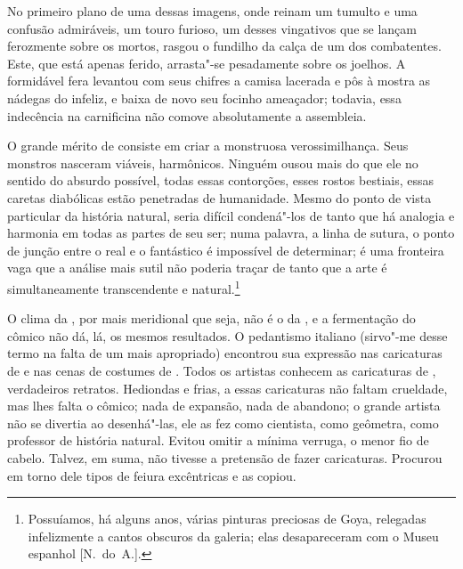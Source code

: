 No primeiro plano de uma dessas imagens, onde reinam um tumulto e uma
confusão admiráveis, um touro furioso, um desses vingativos que se
lançam ferozmente sobre os mortos, rasgou o fundilho da calça de um dos
combatentes. Este, que está apenas ferido, arrasta"-se pesadamente sobre
os joelhos. A formidável fera levantou com seus chifres a camisa
lacerada e pôs à mostra as nádegas do infeliz, e baixa de novo seu
focinho ameaçador; todavia, essa indecência na carnificina não comove
absolutamente a assembleia.

O grande mérito de  consiste em criar a monstruosa verossimilhança.
Seus monstros nasceram viáveis, harmônicos. Ninguém ousou mais do que
ele no sentido do absurdo possível, todas essas contorções, esses
rostos bestiais, essas caretas diabólicas estão penetradas de
humanidade. Mesmo do ponto de vista particular da história natural,
seria difícil condená"-los de tanto que há analogia e harmonia em todas
as partes de seu ser; numa palavra, a linha de sutura, o ponto de
junção entre o real e o fantástico é impossível de determinar; é uma
fronteira vaga que a análise mais sutil não poderia traçar de tanto que
a arte é simultaneamente transcendente e natural.\footnote{ Possuíamos, 
há alguns anos, várias pinturas preciosas de Goya,
relegadas infelizmente a cantos obscuros da galeria; elas desapareceram
com o Museu espanhol [N.~do~A.].}

\sectionitem

O clima da , por mais meridional que seja, não é o da , e a
fermentação do cômico não dá, lá, os mesmos resultados. O pedantismo
italiano (sirvo"-me desse termo na falta de um mais apropriado)
encontrou sua expressão nas caricaturas de  e nas
cenas de costumes de . Todos os artistas conhecem as caricaturas
de , verdadeiros retratos. Hediondas e frias, a essas
caricaturas não faltam crueldade, mas lhes falta o cômico; nada de
expansão, nada de abandono; o grande artista não se divertia ao
desenhá"-las, ele as fez como cientista, como geômetra, como professor
de história natural. Evitou omitir a mínima verruga, o menor fio de
cabelo. Talvez, em suma, não tivesse a pretensão de fazer caricaturas.
Procurou em torno dele tipos de feiura excêntricas e as copiou.

